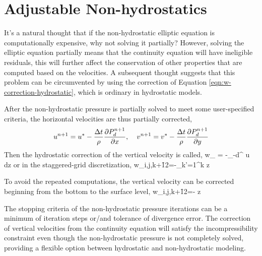 \normalsize
\section{Adjustable Non-hydrostatics}

It's a natural thought that if the non-hydrostatic elliptic equation is computationally expensive, why not solving it partially? However, solving the elliptic equation partially means that the continuity equation will have ineligible residuals, this will further affect the conservation of other properties that are computed based on the velocities. A subsequent thought suggests that this problem can be circumvented by using the correction of Equation \ref{eqn:w-correction-hydrostatic}, which is ordinary in hydrostatic models.

After the non-hydrostatic pressure is partially solved to meet some user-specified criteria, the horizontal velocities are thus partially corrected,
\begin{equation}
u^{n+1}=u^*-\frac{\Delta t}{\rho} \frac{\partial
P_d^{n+1}}{\partial x} ,\hspace{0.15in}
v^{n+1}=v^*-\frac{\Delta t}{\rho} \frac{\partial
P^{n+1}_d}{\partial y}
\end{equation}
Then the hydrostatic correction of the vertical velocity is called,
\be
w_{\xi} = -\int_{-d}^{\xi} \di u dz
\ee
or in the staggered-grid discretization,
\be
w_{i,j,k+\f{1}{2}}=-\sum_{k'=1}^k  \Delta z
\ee

To avoid the repeated computations, the vertical velocity can be corrected beginning from the bottom to the surface level,
\be
w_{i,j,k+\f{1}{2}}=-  \Delta z
\label{eqn:hydrostatic-correction}
\ee

The stopping criteria of the non-hydrostatic pressure iterations can be a minimum of iteration steps or/and tolerance of divergence error. The correction of vertical velocities from the continuity equation will satisfy the incompressibility constraint even though the non-hydrostatic pressure is not completely solved, providing a flexible option between hydrostatic and non-hydrostatic modeling.

